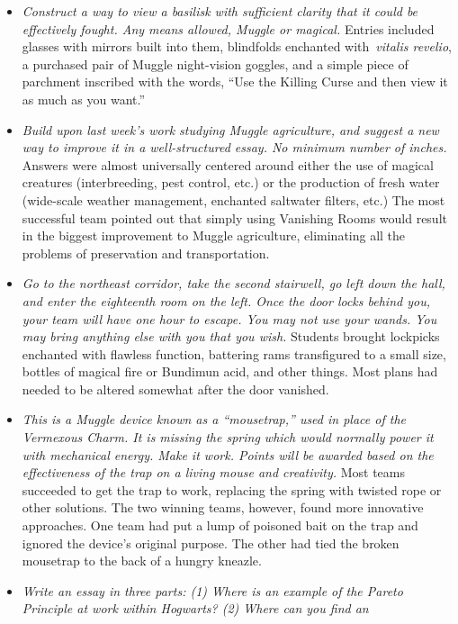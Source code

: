 \begin{itemize}
\tightlist
\item
  \emph{Construct a way to view a basilisk with sufficient clarity that
  it could be effectively fought. Any means allowed, Muggle or magical.}
  Entries included glasses with mirrors built into them, blindfolds
  enchanted with~\emph{vitalis revelio}, a purchased pair of Muggle
  night-vision goggles, and a simple piece of parchment inscribed with
  the words, ``Use the Killing Curse and then view it as much as you
  want.''
\item
  \emph{Build upon last week's work studying Muggle agriculture, and
  suggest a new way to improve it in a well-structured essay. No minimum
  number of inches.} Answers were almost universally centered around
  either the use of magical creatures (interbreeding, pest control,
  etc.) or the production of fresh water (wide-scale weather management,
  enchanted saltwater filters, etc.) The most successful team pointed
  out that simply using Vanishing Rooms would result in the biggest
  improvement to Muggle agriculture, eliminating all the problems of
  preservation and transportation.
\item
  \emph{Go to the northeast corridor, take the second stairwell, go left
  down the hall, and enter the eighteenth room on the left. Once the
  door locks behind you, your team will have one hour to escape. You may
  not use your wands. You may bring anything else with you that you
  wish.} Students brought lockpicks enchanted with flawless function,
  battering rams transfigured to a small size, bottles of magical fire
  or Bundimun acid, and other things. Most plans had needed to be
  altered somewhat after the door vanished.
\item
  \emph{This is a Muggle device known as a ``mousetrap,'' used in place
  of the Vermexous Charm. It is missing the spring which would normally
  power it with mechanical energy. Make it work. Points will be awarded
  based on the effectiveness of the trap on a living mouse and
  creativity.} Most teams succeeded to get the trap to work, replacing
  the spring with twisted rope or other solutions. The two winning
  teams, however, found more innovative approaches. One team had put a
  lump of poisoned bait on the trap and ignored the device's original
  purpose. The other had tied the broken mousetrap to the back of a
  hungry kneazle.
\item
  \emph{Write an essay in three parts: (1) Where is an example of the
  Pareto Principle at work within Hogwarts? (2) Where can you find an
}
\end{itemize}
